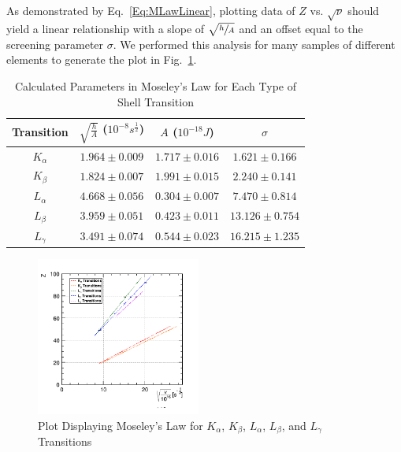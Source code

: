 \documentclass[%
 reprint,
 amsmath,amssymb,
 aps,
 pra,
]{revtex4-1}
\begin{document}
As demonstrated by Eq.~\ref{Eq:MLawLinear}, plotting data of $Z$ vs. $\sqrt{\nu}$ should yield a linear relationship with a slope of $\sqrt{\sfrac{h}{A}}$ and an offset equal to the screening parameter $\sigma$. We performed this analysis for many samples of different elements to generate the plot in Fig.~\ref{Fig:MLawPlot}.

\begin{table}[htbp]
	\begin{center}
		\begin{tabular}{|c|c|c|c|}
			\hline Transition & $\sqrt{\frac{h}{A}}$ ($ 10^{-8} s^{\frac{1}{2}}$)  & $A$ ($10^{-18} J$) & $\sigma$ \\
			\hline $K_{\alpha}$ & $1.964 \pm 0.009$ & $1.717 \pm 0.016$ & $1.621 \pm 0.166$ \\
			\hline $K_{\beta}$ & $1.824 \pm 0.007$ & $1.991 \pm 0.015$ & $2.240 \pm 0.141$ \\
			\hline $L_{\alpha}$ & $4.668 \pm 0.056$ & $0.304 \pm 0.007$ & $7.470 \pm 0.814$ \\
			\hline $L_{\beta}$ & $3.959 \pm 0.051$ & $0.423 \pm 0.011$ & $13.126 \pm 0.754$ \\
			\hline $L_{\gamma}$ & $3.491 \pm 0.074$ & $0.544 \pm 0.023$ & $16.215 \pm 1.235$ \\
			\hline
		\end{tabular}
	\end{center}
	\caption{Calculated Parameters in Moseley's Law for Each Type of Shell Transition}
	\label{Tab:MLawData}
\end{table}

\begin{figure}[H]
	\centering
	\includegraphics[width=0.48\textwidth]{MoseleyLawPlot.png}
	\caption{Plot Displaying Moseley's Law for $K_{\alpha}$, $K_{\beta}$, $L_{\alpha}$, $L_{\beta}$, and $L_{\gamma}$ Transitions}
	\label{Fig:MLawPlot}
\end{figure} 
\end{document}
